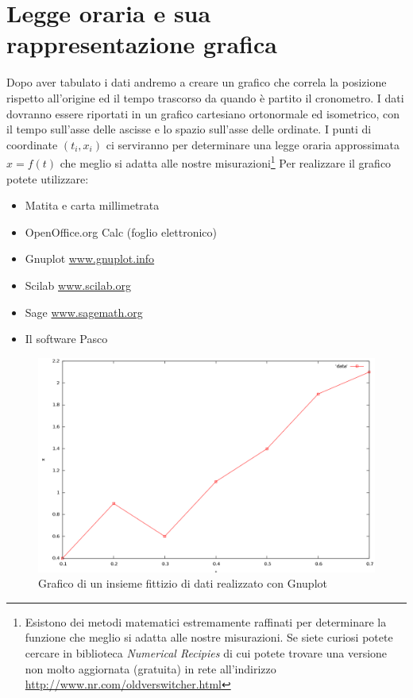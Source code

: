 \documentclass[a4paper,10pt,oneside]{article}
\begin{document}
\section{ Legge oraria e sua rappresentazione grafica}
Dopo aver tabulato i dati andremo a creare un grafico che correla la posizione rispetto all'origine ed il tempo trascorso da quando è partito il cronometro. I dati dovranno essere riportati in un grafico cartesiano ortonormale ed isometrico, con il tempo sull'asse delle ascisse e lo spazio sull'asse delle ordinate. I punti di coordinate $(t_i,x_i)$ ci serviranno per determinare una legge oraria approssimata $x=f(t)$ che meglio si adatta alle nostre misurazioni\footnote{Esistono dei metodi matematici estremamente raffinati per determinare la funzione che meglio si adatta alle nostre misurazioni. Se siete curiosi potete cercare in biblioteca \textsl{Numerical Recipies} di cui potete trovare una versione non molto aggiornata (gratuita) in rete all'indirizzo \url{http://www.nr.com/oldverswitcher.html} }
Per realizzare il grafico potete utilizzare:
\begin{itemize}
 \item Matita e carta millimetrata
 \item OpenOffice.org Calc (foglio elettronico)
 \item Gnuplot \url{www.gnuplot.info}
 \item Scilab \url{www.scilab.org}
 \item Sage \url{www.sagemath.org}
 \item Il software Pasco
\end{itemize}

\begin{figure}[H]
 \centering
 \includegraphics[width=\textwidth]{./gnuplot1.png}
 \caption{Grafico di un insieme fittizio di dati realizzato con Gnuplot}
 \label{fig:gnuplot_1}
\end{figure}
\end{document}
